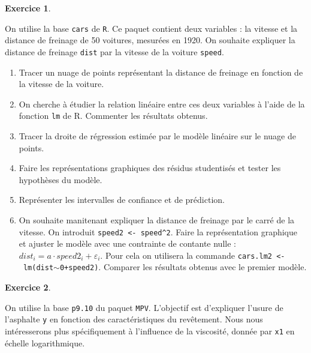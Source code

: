 \documentclass[11pt,a4paper]{article}
\newcommand{\mytilde}{$\sim$}
\newcommand{\fleche}{\texttt{<-}}%
\renewcommand{\epsilon}{\varepsilon}
\newtheorem{exercice}{\textbf{Exercice}}
\begin{document}
\vspace{1cm}


\begin{exercice}
\end{exercice}
On utilise la base \verb+cars+ de \verb+R+. Ce paquet contient deux variables : la vitesse et la distance de freinage de 50 voitures, mesurées en 1920. On souhaite expliquer la distance de freinage \verb+dist+ par la vitesse de la voiture \verb+speed+.

\begin{enumerate}
	\item Tracer un nuage de points représentant la distance de freinage en fonction de la vitesse de la voiture.
	\item On cherche à étudier la relation linéaire entre ces deux variables à l'aide de la fonction \verb+lm+ de R. Commenter les résultats obtenus.
	\item Tracer la droite de régression estimée par le modèle linéaire sur le nuage de points.
\item Faire les représentations graphiques des résidus studentisés et tester les hypothèses du modèle.
\item Représenter les intervalles de confiance et de prédiction.
\item On souhaite manitenant expliquer la distance de freinage par le carré de la vitesse. On introduit \verb+speed2 <- speed^2+. Faire la représentation graphique et ajuster le modèle avec une contrainte de contante nulle : $dist_i=a\cdot speed2_i+\epsilon_i$. Pour cela on utilisera la commande \texttt{cars.lm2 \fleche~lm(dist\mytilde 0+speed2)}. Comparer les résultats obtenus avec le premier modèle.

\end{enumerate}




\vspace{1cm}


\begin{exercice}
\end{exercice}
On utilise la base \verb+p9.10+ du paquet \verb+MPV+. L'objectif est d'expliquer l'usure de l'asphalte \verb+y+ en fonction des caractéristiques du revêtement. Nous nous intéresserons plus spécifiquement à l'influence de la viscosité, donnée par \verb+x1+ en échelle logarithmique.
\end{document}
